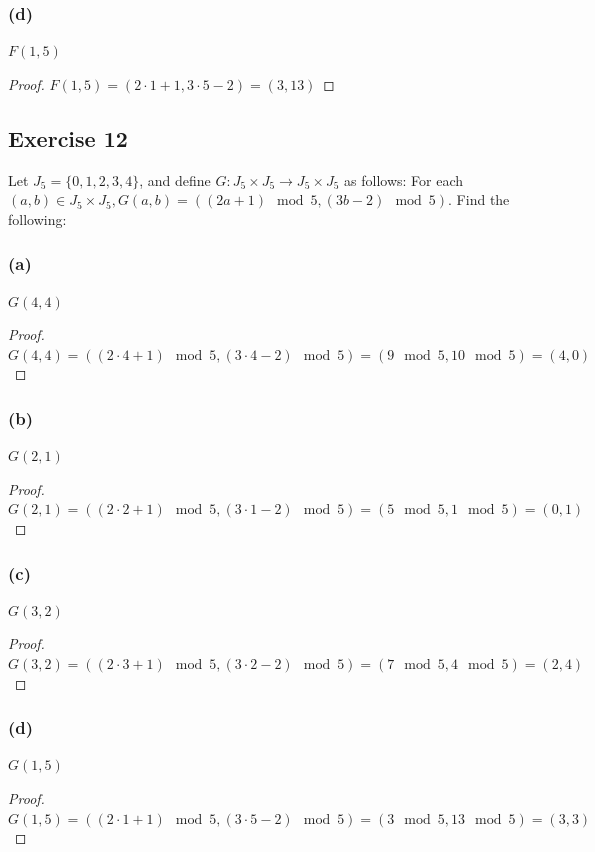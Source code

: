 \documentclass[14pt]{extarticle}
\begin{document}
\subsubsection{(d)}
$F(1,5)$

\begin{proof}
\(F(1, 5) = (2 \cdot 1 + 1, 3 \cdot 5 - 2) = (3, 13)\)
\end{proof}

\subsection{Exercise 12}
Let \(J_5 = \{0, 1, 2, 3, 4\}\), and define \(G: J_5 \times J_5 \to J_5 \times J_5\) as follows: For each \((a,b) \in 
J_5 \times J_5, G(a,b) = ((2a+1) \mod 5, (3b-2) \mod 5)\). Find the following:

\subsubsection{(a)}
$G(4,4)$

\begin{proof}
\(G(4, 4) = ((2 \cdot 4 + 1) \mod 5, (3 \cdot 4 - 2) \mod 5) = (9 \mod 5, 10 \mod 5) = (4, 0)\)
\end{proof}

\subsubsection{(b)}
$G(2,1)$

\begin{proof}
\(G(2, 1) = ((2 \cdot 2 + 1) \mod 5, (3 \cdot 1 - 2) \mod 5) = (5 \mod 5, 1 \mod 5) = (0, 1)\)
\end{proof}

\subsubsection{(c)}
$G(3,2)$

\begin{proof}
\(G(3, 2) = ((2 \cdot 3 + 1) \mod 5, (3 \cdot 2 - 2) \mod 5) = (7 \mod 5, 4 \mod 5) = (2, 4)\)
\end{proof}

\subsubsection{(d)}
$G(1,5)$

\begin{proof}
\(G(1, 5) = ((2 \cdot 1 + 1) \mod 5, (3 \cdot 5 - 2) \mod 5) = (3 \mod 5, 13 \mod 5) = (3, 3)\)
\end{proof}
\end{document}
